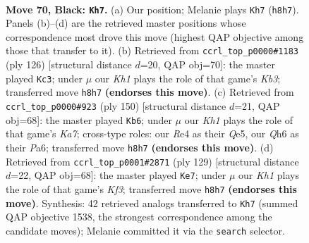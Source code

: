 \documentclass[11pt]{article}
\begin{document}
\clearpage

\begin{figure}[p]\centering
\begin{subfigure}{0.46\textwidth}\centering
\resizebox{\linewidth}{!}{%
\newchessgame
\chessboard[
  setfen={2Q4k/8/5p1q/3p4/4r3/6P1/6KP/8 b - - 21 70},
  showmover=false,
  pgfstyle=straightmove, color=movearrow, markmove={h8-h7}
]}
\caption{}
\end{subfigure}\hfill
\begin{subfigure}{0.46\textwidth}\centering
\resizebox{\linewidth}{!}{%
\newchessgame
\chessboard[
  setfen={1q6/5p1k/7p/3Q4/8/1K5P/2P5/8 w - - 10 64},
  showmover=false,
  pgfstyle=straightmove, color=movearrow, markmove={b3-c3}
]}
\caption{}
\end{subfigure}
\\[4pt]
\begin{subfigure}{0.46\textwidth}\centering
\resizebox{\linewidth}{!}{%
\newchessgame
\chessboard[
  setfen={8/K4qpk/P6p/4Q3/8/6P1/8/8 w - - 7 76},
  showmover=false,
  pgfstyle=straightmove, color=movearrow, markmove={a7-b6}
]}
\caption{}
\end{subfigure}\hfill
\begin{subfigure}{0.46\textwidth}\centering
\resizebox{\linewidth}{!}{%
\newchessgame
\chessboard[
  setfen={8/8/Q4k2/3q3p/3P4/7P/6P1/6K1 b - - 0 65},
  showmover=false,
  pgfstyle=straightmove, color=movearrow, markmove={f6-e7}
]}
\caption{}
\end{subfigure}
\caption{\textbf{Move 70, Black: \texttt{Kh7}.} (a) Our position; Melanie plays \texttt{Kh7} (\texttt{h8h7}). Panels (b)--(d) are the retrieved master positions whose correspondence most drove this move (highest QAP objective among those that transfer to it). (b) Retrieved from \texttt{ccrl\_top\_p0000\#1183} (ply 126) [structural distance $d$=20, QAP obj=70]: the master played \texttt{Kc3}; under $\mu$ our \emph{Kh1} plays the role of that game's \emph{Kb3}; transferred move \texttt{h8h7} \textbf{(endorses this move)}. (c) Retrieved from \texttt{ccrl\_top\_p0000\#923} (ply 150) [structural distance $d$=21, QAP obj=68]: the master played \texttt{Kb6}; under $\mu$ our \emph{Kh1} plays the role of that game's \emph{Ka7}; cross-type roles: our \emph{R}e4 as their \emph{Q}e5, our \emph{Q}h6 as their \emph{P}a6; transferred move \texttt{h8h7} \textbf{(endorses this move)}. (d) Retrieved from \texttt{ccrl\_top\_p0001\#2871} (ply 129) [structural distance $d$=22, QAP obj=68]: the master played \texttt{Ke7}; under $\mu$ our \emph{Kh1} plays the role of that game's \emph{Kf3}; transferred move \texttt{h8h7} \textbf{(endorses this move)}. Synthesis: 42 retrieved analogs transferred to \texttt{Kh7} (summed QAP objective 1538, the strongest correspondence among the candidate moves); Melanie committed it via the \texttt{search} selector.}
\label{fig:thought-m139}
\end{figure}
\end{document}
